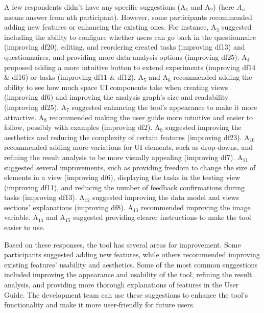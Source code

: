 A few respondents didn't have any specific suggestions (A$_1$ and A$_2$) (here \textit{A$_n$} means answer from nth participant). 
However, some participants recommended adding new features or enhancing the existing ones. 
For instance, A$_3$ suggested including the ability to configure whether users can go back in the questionnaire (improving \ac{df}20), editing, and reordering created tasks (improving \ac{df}13) and questionnaires, and providing more data analysis options (improving \ac{df}25). 
A$_4$ proposed adding a more intuitive button to extend experiments (improving \ac{df}14 \& \ac{df}16) or tasks (improving \ac{df}11 \& \ac{df}12). 
A$_5$ and A$_6$ recommended adding the ability to see how much space UI components take when creating views (improving \ac{df}6) and improving the analysis graph's size and readability (improving \ac{df}25). 
A$_7$ suggested enhancing the tool's appearance to make it more attractive. 
A$_8$ recommended making the user guide more intuitive and easier to follow, possibly with examples (improving \ac{df}2). 
A$_9$ suggested improving the aesthetics and reducing the complexity of certain features (improving \ac{df}23). 
A$_{10}$ recommended adding more variations for UI elements, such as drop-downs, and refining the result analysis to be more visually appealing (improving \ac{df}7). 
A$_{11}$ suggested several improvements, such as providing freedom to change the size of elements in a view (improving \ac{df}6), displaying the tasks in the testing view (improving \ac{df}11), and reducing the number of feedback confirmations during tasks (improving \ac{df}13).
A$_{12}$ suggested improving the data model and views sections' explanations (improving \ac{df}8).
A$_{13}$ recommended improving the image variable. 
A$_{14}$ and A$_{15}$ suggested providing clearer instructions to make the tool easier to use.

Based on these responses, the tool has several areas for improvement. 
Some participants suggested adding new features, while others recommended improving existing features' usability and aesthetics. 
Some of the most common suggestions included improving the appearance and usability of the tool, refining the result analysis, and providing more thorough explanations of features in the User Guide. 
The development team can use these suggestions to enhance the tool's functionality and make it more user-friendly for future users. 

